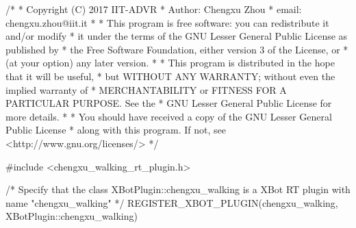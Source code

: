 /*
 * Copyright (C) 2017 IIT-ADVR
 * Author: Chengxu Zhou
 * email: chengxu.zhou@iit.it
 *
 * This program is free software: you can redistribute it and/or modify
 * it under the terms of the GNU Lesser General Public License as published by
 * the Free Software Foundation, either version 3 of the License, or
 * (at your option) any later version.
 *
 * This program is distributed in the hope that it will be useful,
 * but WITHOUT ANY WARRANTY; without even the implied warranty of
 * MERCHANTABILITY or FITNESS FOR A PARTICULAR PURPOSE. See the
 * GNU Lesser General Public License for more details.
 *
 * You should have received a copy of the GNU Lesser General Public License
 * along with this program. If not, see <http://www.gnu.org/licenses/>
*/

#include <chengxu_walking_rt_plugin.h>

/* Specify that the class XBotPlugin::chengxu_walking is a XBot RT plugin with name "chengxu_walking" */
REGISTER_XBOT_PLUGIN(chengxu_walking, XBotPlugin::chengxu_walking)

